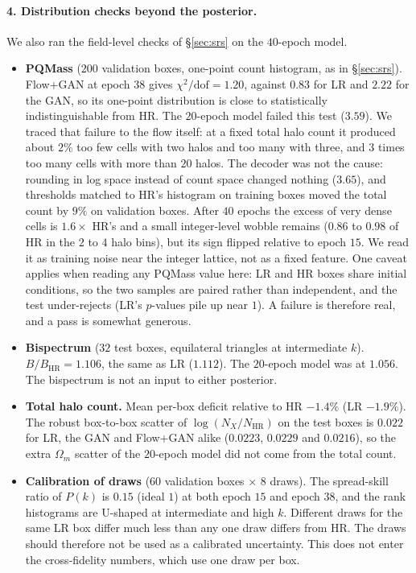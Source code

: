 \paragraph{4. Distribution checks beyond the posterior.} We also ran the
field-level checks of \S\ref{sec:srs} on the $40$-epoch model.
\begin{itemize}
  \item \textbf{PQMass} ($200$ validation boxes, one-point count histogram, as in
  \S\ref{sec:srs}). Flow+GAN at epoch $38$ gives $\chi^2/\text{dof}=1.20$, against
  $0.83$ for LR and $2.22$ for the GAN, so its one-point distribution is close to
  statistically indistinguishable from HR. The $20$-epoch model failed this test
  ($3.59$). We traced that failure to the flow itself: at a fixed total halo count
  it produced about $2\%$ too few cells with two halos and too many with three, and
  $3$ times too many cells with more than $20$ halos. The decoder was not the cause:
  rounding in log space instead of count space changed nothing ($3.65$), and
  thresholds matched to HR's histogram on training boxes moved the total count by
  $9\%$ on validation boxes. After $40$ epochs the excess of very dense cells is
  $1.6\times$ HR's and a small integer-level wobble remains ($0.86$ to $0.98$ of HR
  in the $2$ to $4$ halo bins), but its sign flipped relative to epoch $15$. We read
  it as training noise near the integer lattice, not as a fixed feature. One
  caveat applies when reading any PQMass value here: LR and HR boxes share initial
  conditions, so the two samples are paired rather than independent, and the test
  under-rejects (LR's $p$-values pile up near $1$). A failure is therefore real,
  and a pass is somewhat generous.
  \item \textbf{Bispectrum} ($32$ test boxes, equilateral triangles at
  intermediate $k$). $B/B_\text{HR}=1.106$, the same as LR ($1.112$). The
  $20$-epoch model was at $1.056$. The bispectrum is not an input to either
  posterior.
  \item \textbf{Total halo count.} Mean per-box deficit relative to HR $-1.4\%$
  (LR $-1.9\%$). The robust box-to-box scatter of $\log(N_X/N_\text{HR})$ on the
  test boxes is $0.022$ for LR, the GAN and Flow+GAN alike ($0.0223$, $0.0229$ and
  $0.0216$), so the extra $\Omega_m$ scatter of the $20$-epoch model did not come
  from the total count.
  \item \textbf{Calibration of draws} ($60$ validation boxes $\times$ $8$ draws).
  The spread-skill ratio of $P(k)$ is $0.15$ (ideal $1$) at both epoch $15$ and
  epoch $38$, and the rank histograms are U-shaped at intermediate and high $k$.
  Different draws for the same LR box differ much less than any one draw differs
  from HR. The draws should therefore not be used as a calibrated uncertainty.
  This does not enter the cross-fidelity numbers, which use one draw per box.
\end{itemize}

